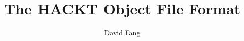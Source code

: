 \documentclass[12pt]{book}
\newif\ifpdf
\begin{document}
\title{The HACKT Object File Format}
\author{David Fang}

\ifpdf\pdfbookmark[0]{Title Page}{title}\fi
\maketitle

\ifpdf\pdfbookmark[0]{Table of Contents}{toc}\fi
\tableofcontents











\appendix



% 

\clearpage
\ifpdf\pdfbookmark[0]{Index}{index}\fi
\printindex
\end{document}
